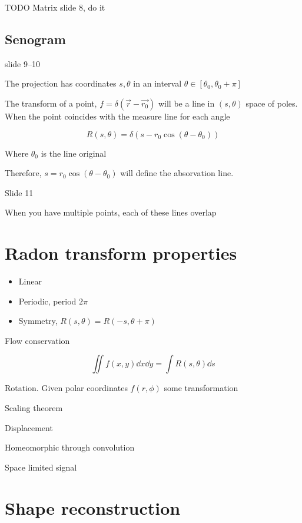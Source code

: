 \documentclass[../main/main.tex]{subfiles}
\begin{document}
TODO Matrix slide 8, do it

\subsection{Senogram}
slide 9--10

The projection has coordinates $s, \theta$ in an interval $\theta \in [\theta_{0}, \theta_{0} + \pi]$

The transform of a point, $f = \delta(\vec{r}-\vec{r_{0}} )$ will be a line in $(s, \theta)$ space of poles. When the point coincides with the measure line for each angle

\begin{equation}
R(s, \theta) = \delta(s - r_{0} \cos (\theta - \theta_{0}))
\end{equation}

Where $\theta_{0}$ is the line original

Therefore, $s = r_{0} \cos(\theta-\theta_{0})$ will define the absorvation line.


Slide 11

When you have multiple points, each of these lines overlap


\section{Radon transform properties}

\begin{itemize}
	\item Linear
	\item Periodic, period $2\pi$
	\item Symmetry, $R(s, \theta) = R(-s, \theta + \pi)$

\end{itemize}

Flow conservation

\begin{equation}
\iint f(x,y) \dd x \dd y = \int R(s, \theta) \dd s
\end{equation}

Rotation. Given polar coordinates $f(r, \phi)$ some transformation

Scaling theorem

Displacement

Homeomorphic through convolution

Space limited signal

\section{Shape reconstruction}
\end{document}
